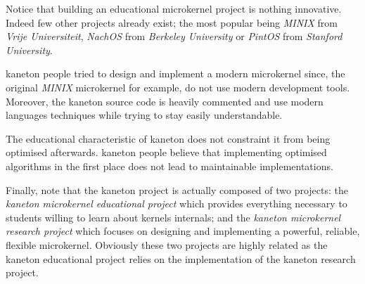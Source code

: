 Notice that building an educational microkernel project is nothing innovative.
Indeed few other projects already exist; the most popular being \textit{MINIX}
from \textit{Vrije Universiteit}, \textit{NachOS} from \textit{Berkeley
University} or \textit{PintOS} from \textit{Stanford University}.

kaneton people tried to design and implement a modern microkernel since, the
original \textit{MINIX} microkernel for example, do not use modern development
tools. Moreover, the kaneton source code is heavily commented and use modern
languages techniques while trying to stay easily understandable.

The educational characteristic of kaneton does not constraint it from being
optimised afterwards. kaneton people believe that implementing optimised
algorithms in the first place does not lead to maintainable implementations.

Finally, note that the kaneton project is actually composed of two projects:
the \textit{kaneton microkernel educational project} which provides everything
necessary to students willing to learn about kernels internals; and the
\textit{kaneton microkernel research project} which focuses on designing and
implementing a powerful, reliable, flexible microkernel. Obviously these
two projects are highly related as the kaneton educational project relies on
the implementation of the kaneton research project.
